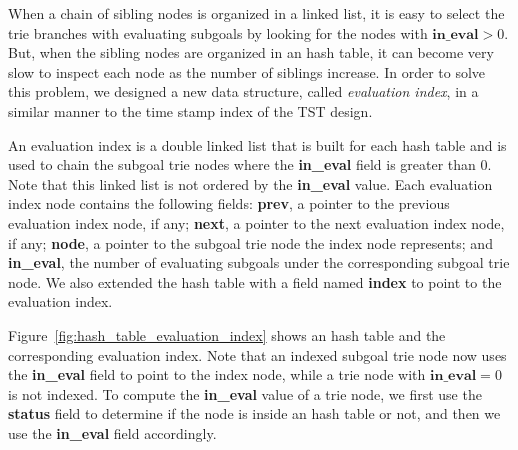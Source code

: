 When a chain of sibling nodes is organized in a linked list, it is
easy to select the trie branches with evaluating subgoals by looking
for the nodes with $\textbf{in\_eval} > 0$. But, when the sibling nodes are
organized in an hash table, it can become very slow to inspect each
node as the number of siblings increase. In order to solve this
problem, we designed a new data structure, called \textit{evaluation
index}, in a similar manner to the time stamp index of the TST design.

An evaluation index is a double linked list that is built for each
hash table and is used to chain the subgoal trie nodes where the
\textbf{in\_eval} field is greater than 0. Note that this linked list is not
ordered by the \textbf{in\_eval} value. Each evaluation index node contains
the following fields: \textbf{prev}, a pointer to the previous evaluation
index node, if any; \textbf{next}, a pointer to the next evaluation index
node, if any; \textbf{node}, a pointer to the subgoal trie node the index
node represents; and \textbf{in\_eval}, the number of evaluating subgoals
under the corresponding subgoal trie node. We also extended the hash
table with a field named \textbf{index} to point to the evaluation index.

Figure~\ref{fig:hash_table_evaluation_index} shows an hash table and
the corresponding evaluation index. Note that an indexed subgoal trie
node now uses the \textbf{in\_eval} field to point to the index node, while a
trie node with $\textbf{in\_eval} = 0$ is not indexed. To compute the
\textbf{in\_eval} value of a trie node, we first use the \textbf{status} field to
determine if the node is inside an hash table or not, and then we use the
\textbf{in\_eval} field accordingly.

